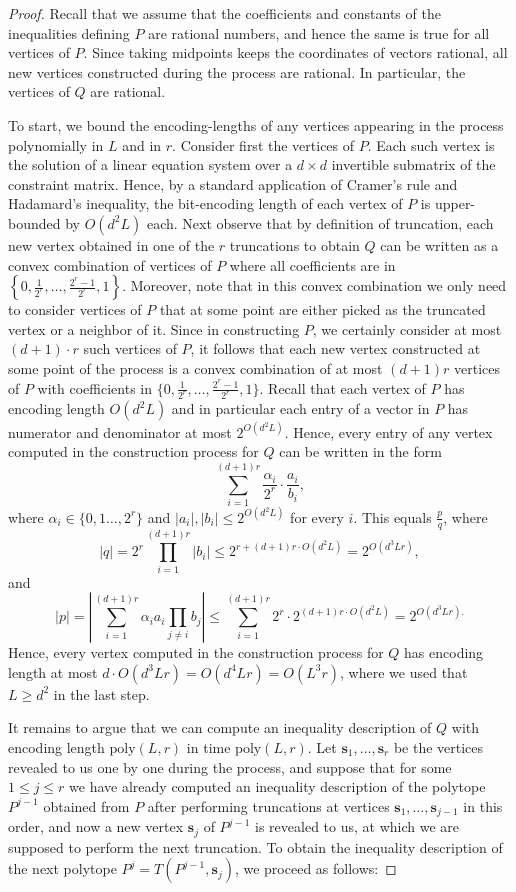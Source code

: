 \documentclass[centering,11pt,reqno]{amsart}
\theoremstyle{definition}
\begin{document}
\begin{proof}
Recall that we assume that the coefficients and constants of the inequalities defining $P$ are rational numbers, and hence the same is true for all vertices of $P$. Since taking midpoints keeps the coordinates of vectors rational, all new vertices constructed during the process are rational. In particular, the vertices of $Q$ are rational.

To start, we bound the encoding-lengths of any vertices appearing in the process polynomially in $L$ and in $r$. Consider first the vertices of $P$. Each such vertex is the solution of a linear equation system over a $d\times d$ invertible submatrix of the constraint matrix. Hence, by a standard application of Cramer's rule and Hadamard's inequality, the bit-encoding length of each vertex of $P$ is upper-bounded by $O(d^2L)$ each. Next observe that by definition of truncation, each new vertex obtained in one of the $r$ truncations to obtain $Q$ can be written as a convex combination of vertices of $P$ where all coefficients are in $\left\{0,\frac{1}{2^r},\ldots,\frac{2^r-1}{2^r},1\right\}$. Moreover, note that in this convex combination we only need to consider vertices of $P$ that at some point are either picked as the truncated vertex or a neighbor of it. Since in constructing $P$, we certainly consider at most $(d+1)\cdot r$ such vertices of $P$, it follows that each new vertex constructed at some point of the process is a convex combination of at most $(d+1)r$ vertices of $P$ with coefficients in $\{0,\frac{1}{2^r},\ldots,\frac{2^r-1}{2^r},1\}$. Recall that each vertex of $P$ has encoding length $O(d^2L)$ and in particular each entry of a vector in $P$ has numerator and denominator at most $2^{O(d^2L)}$. Hence, every entry of any vertex computed in the construction process for $Q$ can be written in the form
$$\sum_{i=1}^{(d+1)r}\frac{\alpha_i}{2^r}\cdot \frac{a_i}{b_i},$$ where $\alpha_i\in \{0,1\ldots,2^r\}$ and $|a_i|,|b_i|\le 2^{O(d^2L)}$ for every $i$. This equals $\frac{p}{q}$, where 
$$|q|=2^r\prod_{i=1}^{(d+1)r}{|b_i|}\le 2^{r+(d+1)r\cdot O(d^2L)}=2^{O(d^3Lr)},$$ and 
$$|p|= \left|\sum_{i=1}^{(d+1)r}\alpha_ia_i\prod_{j\neq i}b_j\right|\le \sum_{i=1}^{(d+1)r}2^r\cdot 2^{(d+1)r\cdot O(d^2L)}=2^{O(d^3Lr).}$$ Hence, every vertex computed in the construction process for $Q$ has encoding length at most $d\cdot O(d^3Lr)=O(d^4Lr)=O(L^3r)$, where we used that $L\ge d^2$ in the last step. 

It remains to argue that we can compute an inequality description of $Q$ with encoding length $\mathrm{poly}(L,r)$ in time $\mathrm{poly}(L,r)$. Let $\mathbf{s}_1,\ldots,\mathbf{s}_r$ be the vertices revealed to us one by one during the process, and suppose that for some $1\le j \le r$ we have already computed an inequality description of the polytope $P^{j-1}$ obtained from $P$ after performing truncations at vertices $\mathbf{s}_1,\ldots,\mathbf{s}_{j-1}$ in this order, and now a new vertex $\mathbf{s}_j$ of $P^{j-1}$ is revealed to us, at which we are supposed to perform the next truncation. To obtain the inequality description of the next polytope $P^{j}=T(P^{j-1},\mathbf{s}_j)$, we proceed as follows:


\end{proof}
\end{document}
